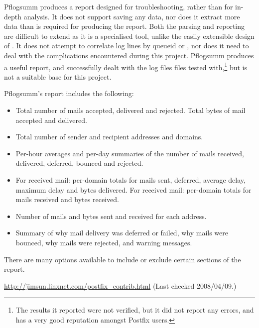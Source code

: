 Pflogsumm produces a report designed for troubleshooting, rather than for
in-depth analysis.  It does not support saving any data, nor does it
extract more data than is required for producing the report.  Both the
parsing and reporting are difficult to extend as it is a specialised tool,
unlike the easily extensible design of \parsername{}.  It does not attempt
to correlate log lines by queueid or \pid{}, nor does it need to deal with
the complications encountered during this project.  Pflogsumm produces a
useful report, and successfully dealt with the \numberOFlogFILES{} log
files files tested with,\footnote{The results it reported were not
verified, but it did not report any errors, and has a very good reputation
amongst Postfix users.} but is not a suitable base for this project.

Pflogsumm's report includes the following:

\begin{itemize}

    \item Total number of mails accepted, delivered and rejected.  Total
        bytes of mail accepted and delivered.

    \item Total number of sender and recipient addresses and domains.

    \item Per-hour averages and per-day summaries of the number of mails
        received, delivered, deferred, bounced and rejected.

    \item For received mail: per-domain totals for mails sent, deferred,
        average delay, maximum delay and bytes delivered.  For received
        mail: per-domain totals for mails received and bytes received.

    \item Number of mails and bytes sent and received for each address.

    \item Summary of why mail delivery was deferred or failed, why mails
        were bounced, why mails were rejected, and warning messages.

\end{itemize}

There are many options available to include or exclude certain sections of
the report.

\url{http://jimsun.linxnet.com/postfix_contrib.html} \newline (Last checked
2008/04/09.)


